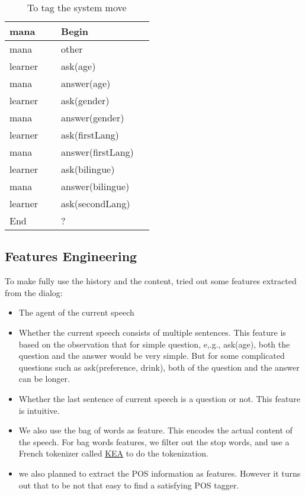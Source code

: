 \documentclass[a4paper]{article}
\begin{document}
\begin{table}
    \begin{tabular}{|l|l|}
        \hline
        mana    & Begin \\ \hline
        mana    & other              \\ \hline
        learner & ask(age)           \\ \hline
        mana    & answer(age)        \\ \hline
        learner & ask(gender)        \\ \hline
        mana    & answer(gender)     \\ \hline
        learner & ask(firstLang)     \\ \hline
        mana    & answer(firstLang)  \\ \hline
        learner & ask(bilingue)      \\ \hline
        mana    & answer(bilingue)   \\ \hline
        learner & ask(secondLang)    \\ \hline
        End     & ?                  \\ \hline
    \end{tabular}
    \caption{To tag the system move}
    \label{table:system_align}
\end{table}

\subsection{Features Engineering}
To make fully use the history and the content, tried out some features extracted from the dialog:
\begin{itemize}
    \item The agent of the current speech
    \item Whether the current speech consists of multiple sentences. This feature is based on the observation that for simple question, e,.g., ask(age), both the question and the answer would be very simple. But for some complicated questions such as ask(preference, drink), both of the question and the answer can be longer.
    \item Whether the last sentence of current speech is a question or not. This feature is intuitive.
    \item We also use the bag of words as feature. This encodes the actual content of the speech. For bag words features, we filter out the stop words, and use a French tokenizer called \href{https://github.com/boudinfl/kea}{KEA} to do the tokenization.
    \item we also planned to extract the POS information as features. However it turns out that to be not that easy to find a satisfying POS tagger.
\end{itemize}
\end{document}
